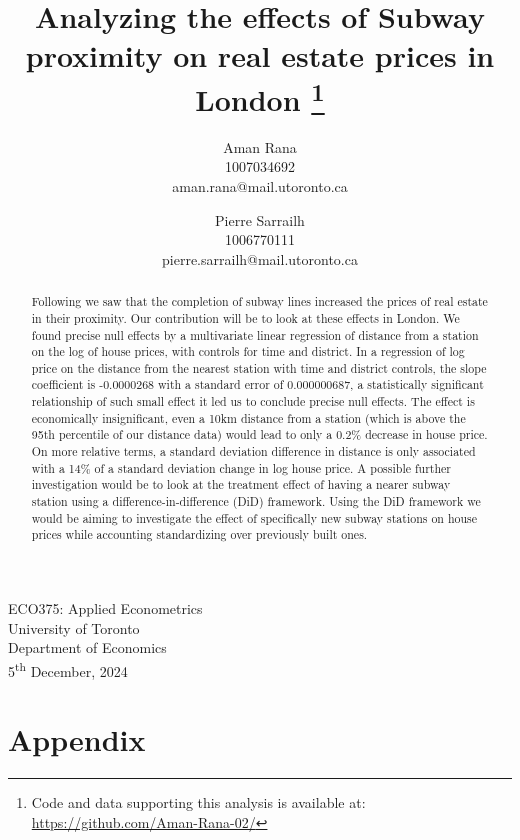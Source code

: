 \documentclass[11pt,a4paper,english]{article}
\date{\displaydate{date}}
\title{Analyzing the effects of Subway proximity on real estate prices in London 
\thanks{Code and data supporting this analysis is available at: \url{https://github.com/Aman-Rana-02/}}}
\author{%
  Aman Rana \\ 1007034692 \\ aman.rana@mail.utoronto.ca
  \and
  Pierre Sarrailh \\ 1006770111 \\ pierre.sarrailh@mail.utoronto.ca
}
\date{}
\begin{document}
  \maketitle
  \begin{center}
    ECO375: Applied Econometrics \\ 
    University of Toronto \\ 
    Department of Economics \\
    5\textsuperscript{th} December, 2024
  \end{center}

  \begin{abstract}
    \noindent Following \citet{zhou_2019} we saw that the completion of subway lines increased the prices of real estate in their proximity. Our contribution will be to look at these effects in London. 
     We found precise null effects by a multivariate linear regression of distance from a station on the log of house prices, with controls for time and district. In a regression of log price on the distance 
     from the nearest station with time and district controls, the slope coefficient is -0.0000268 with a standard error of 0.000000687, 
     a statistically significant relationship of such small effect it led us to conclude precise null effects. 
     The effect is economically insignificant, even a 10km distance from a station (which is above the 95th 
     percentile of our distance data) would lead to only a 0.2\% decrease in house price. 
     On more relative terms, a standard deviation difference in distance is only associated with a 
     14\% of a standard deviation change in log house price. 
     A possible further investigation would be to look at the treatment effect of having a 
     nearer subway station using a difference-in-difference (DiD) framework. 
     Using the DiD framework we would be aiming to investigate the effect of specifically 
     new subway stations on house prices while accounting standardizing over previously built ones.
  \end{abstract}


  \newpage
  

  

  
  
  

  

  \newpage
  
  

  \newpage
  \section*{Appendix}
  \renewcommand{\thesection}{\Alph{section}}
  \setcounter{section}{0}
  
\end{document}
